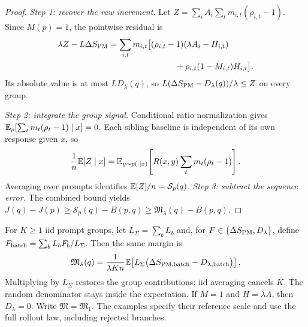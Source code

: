 \begin{proof}
\emph{Step 1: recover the raw increment.}
Let $Z=\sum_i A_i\sum_t m_{i,t}(\rho_{i,t}-1)$.
Since $M(p)=1$, the pointwise residual is
\begin{align*}
 \lambda Z-L\Delta S_{\rm PM}
 &=\sum_{i,t}m_{i,t}\bigl[(\rho_{i,t}-1)(\lambda A_i-H_{i,t})\\
 &\hspace{28mm}+\rho_{i,t}(1-M_{i,t})H_{i,t}\bigr].
\end{align*}
Its absolute value is at most $LD_\lambda(q)$, so
$L(\Delta S_{\rm PM}-D_\lambda(q))/\lambda\le Z$ on every group.

\emph{Step 2: integrate the group signal.} Conditional ratio normalization gives
$\mathbb{E}_p[\sum_t m_t(\rho_t-1)\mid x]=0$. Each sibling baseline is
independent of its own response given $x$, so
\[
 \frac1n\mathbb{E}[Z\mid x]
 =\mathbb{E}_{y\sim p(\cdot\mid x)}\!\left[R(x,y)\sum_t m_t(\rho_t-1)\right].
\]
Averaging over prompts identifies $\mathbb{E}[Z]/n=\mathcal S_p(q)$.
\emph{Step 3: subtract the sequence error.} The combined bound yields
$J(q)-J(p)\ge\mathcal S_p(q)-B(p,q)\ge\mathfrak M_\lambda(q)-B(p,q)$.
\end{proof}

For $K\ge1$ iid prompt groups, let $L_\Sigma=\sum_b L_b$ and, for
$F\in\{\Delta S_{\rm PM},D_\lambda\}$, define
$F_{\rm batch}=\sum_b L_bF_b/L_\Sigma$. Then the same margin is
\[
 \mathfrak M_\lambda(q)=\frac1{\lambda Kn}\mathbb{E}\!\left[
 L_\Sigma\bigl(\Delta S_{{\rm PM},{\rm batch}}-D_{\lambda,{\rm batch}}\bigr)\right].
\]
Multiplying by $L_\Sigma$ restores the group contributions; iid averaging
cancels $K$. The random denominator stays inside the expectation.
If $M=1$ and $H=\lambda A$, then $D_\lambda=0$.
Write $\mathfrak M=\mathfrak M_1$. The examples specify their reference
scale and use the full rollout law, including rejected branches.

